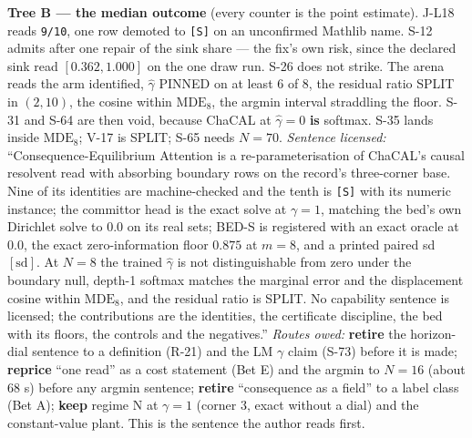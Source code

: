 \documentclass[11pt,a4paper]{article}
\theoremstyle{plain}
\theoremstyle{definition}
\theoremstyle{remark}
\begin{document}
\textbf{Tree B --- the median outcome} (every counter is the point
estimate). J-L18 reads \texttt{9/10}, one row demoted to
\texttt{{[}S{]}} on an unconfirmed Mathlib name. S-12 admits after one
repair of the sink share --- the fix's own risk, since the declared sink
read \([0.362,1.000]\) on the one draw run. S-26 does not strike. The
arena reads the arm identified, \(\hat\gamma\) PINNED on at least 6 of
8, the residual ratio SPLIT in \((2,10)\), the cosine within
\(\mathrm{MDE}_8\), the argmin interval straddling the floor. S-31 and
S-64 are then void, because ChaCAL at \(\hat\gamma=0\) \textbf{is}
softmax. S-35 lands inside \(\mathrm{MDE}_8\); V-17 is SPLIT; S-65 needs
\(N=70\). \emph{Sentence licensed:} ``Consequence-Equilibrium Attention
is a re-parameterisation of ChaCAL's causal resolvent read with
absorbing boundary rows on the record's three-corner base. Nine of its
identities are machine-checked and the tenth is \texttt{{[}S{]}} with
its numeric instance; the committor head is the exact solve at
\(\gamma=1\), matching the bed's own Dirichlet solve to \(0.0\) on its
real sets; BED-S is registered with an exact oracle at \(0.0\), the
exact zero-information floor \(0.875\) at \(m=8\), and a printed paired
sd \([\mathrm{sd}]\). At \(N=8\) the trained \(\hat\gamma\) is not
distinguishable from zero under the boundary null, depth-1 softmax
matches the marginal error and the displacement cosine within
\(\mathrm{MDE}_8\), and the residual ratio is SPLIT. No capability
sentence is licensed; the contributions are the identities, the
certificate discipline, the bed with its floors, the controls and the
negatives.'' \emph{Routes owed:} \textbf{retire} the horizon-dial
sentence to a definition (R-21) and the LM \(\gamma\) claim (S-73)
before it is made; \textbf{reprice} ``one read'' as a cost statement
(Bet E) and the argmin to \(N=16\) (about \(68\) s) before any argmin
sentence; \textbf{retire} ``consequence as a field'' to a label class
(Bet A); \textbf{keep} regime N at \(\gamma=1\) (corner 3, exact without
a dial) and the constant-value plant. This is the sentence the author
reads first.
\end{document}
